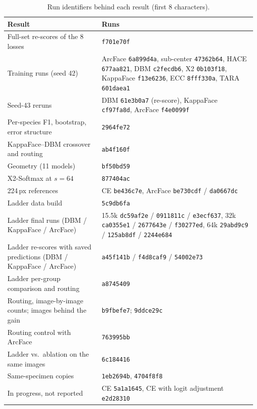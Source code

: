 \documentclass[11pt]{article}
\begin{document}
\begin{table}[t]
\centering
\small
\caption{Run identifiers behind each result (first 8 characters).}
\footnotesize
\begin{tabular}{@{}p{1.9in}p{3.3in}@{}}
\toprule
Result & Runs \\
\midrule
Full-set re-scores of the 8 losses & \texttt{f701e70f} \\
Training runs (seed 42) & ArcFace \texttt{6a899d4a}, sub-center \texttt{47362b64}, HACE \texttt{677aa821}, DBM \texttt{c2fecdb6}, X2 \texttt{0b103f18}, KappaFace \texttt{f13e6236}, ECC \texttt{8fff330a}, TARA \texttt{601daea1} \\
Seed-43 reruns & DBM \texttt{61e3b0a7} (re-score), KappaFace \texttt{cf97fa8d}, ArcFace \texttt{f4e0099f} \\
Per-species F1, bootstrap, error structure & \texttt{2964fe72} \\
KappaFace--DBM crossover and routing & \texttt{ab4f160f} \\
Geometry (11 models) & \texttt{bf50bd59} \\
X2-Softmax at $s=64$ & \texttt{877404ac} \\
224\,px references & CE \texttt{be436c7e}, ArcFace \texttt{be730cdf} / \texttt{da0667dc} \\
Ladder data build & \texttt{5c9db6fa} \\
Ladder final runs (DBM / KappaFace / ArcFace) & 15.5k \texttt{dc59af2e} / \texttt{0911811c} / \texttt{e3ecf637}, 32k \texttt{ca0355e1} / \texttt{2677643e} / \texttt{f30277ed}, 64k \texttt{29abd9c9} / \texttt{125ab8df} / \texttt{2244e684} \\
Ladder re-scores with saved predictions (DBM / KappaFace / ArcFace) & \texttt{a45f141b} / \texttt{f4d8caf9} / \texttt{54002e73} \\
Ladder per-group comparison and routing & \texttt{a8745409} \\
Routing, image-by-image counts; images behind the gain & \texttt{b9fbefe7}; \texttt{9ddce29c} \\
Routing control with ArcFace & \texttt{763995bb} \\
Ladder vs.\ ablation on the same images & \texttt{6c184416} \\
Same-specimen copies & \texttt{1eb2694b}, \texttt{4704f8f8} \\
In progress, not reported & CE \texttt{5a1a1645}, CE with logit adjustment \texttt{e2d28310} \\
\bottomrule
\end{tabular}
\end{table}
\end{document}
